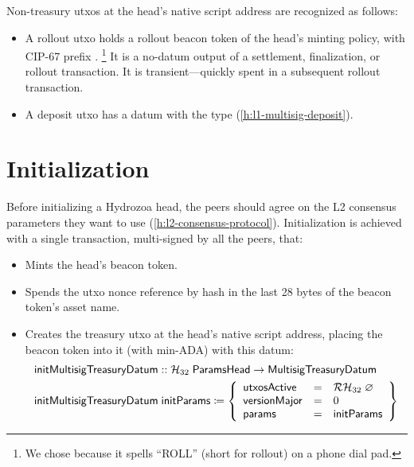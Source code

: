 \documentclass[../hydrozoa.tex]{subfiles}
\begin{document}
Non-treasury utxos at the head's native script address are recognized as follows:
\begin{itemize}
  \item A rollout utxo holds a rollout beacon token of the head's minting policy, with CIP-67 prefix \headRolloutToken{}.%
    \footnote{We chose \headRolloutToken{} because it spells ``ROLL'' (short for rollout) on a phone dial pad.}
    It is a no-datum output of a settlement, finalization, or rollout transaction.
    It is transient---quickly spent in a subsequent rollout transaction.
  \item A deposit utxo has a datum with the  type (\cref{h:l1-multisig-deposit}).
\end{itemize}
  
\section{Initialization}%
\label{h:l1-multisig-initialization}%

Before initializing a Hydrozoa head, the peers should agree on the L2 consensus parameters they want to use (\cref{h:l2-consensus-protocol}).
Initialization is achieved with a single transaction, multi-signed by all the peers, that:
\begin{itemize}
  \item Mints the head's beacon token.
  \item Spends the utxo nonce reference by hash in the last 28 bytes of the beacon token's asset name.
  \item Creates the treasury utxo at the head's native script address, placing the beacon token into it (with min-ADA) with this datum:
    \begin{equation*}
    \begin{split}
      \mathsf{initMultisigTreasuryDatum} &:: \mathcal{H}_{32} \; \mathsf{ParamsHead} -> \mathsf{MultisigTreasuryDatum} \\
      \mathsf{initMultisigTreasuryDatum} &\; \mathsf{initParams} \coloneq \left\{
        \begin{array}{lll}
          \mathsf{utxosActive} &=& \mathcal{RH}_{32} \; \varnothing \\
          \mathsf{versionMajor} &=& 0 \\
          \mathsf{params} &=& \mathsf{initParams}
        \end{array}\right\}
    \end{split}
    \end{equation*}
\end{itemize}
\end{document}
